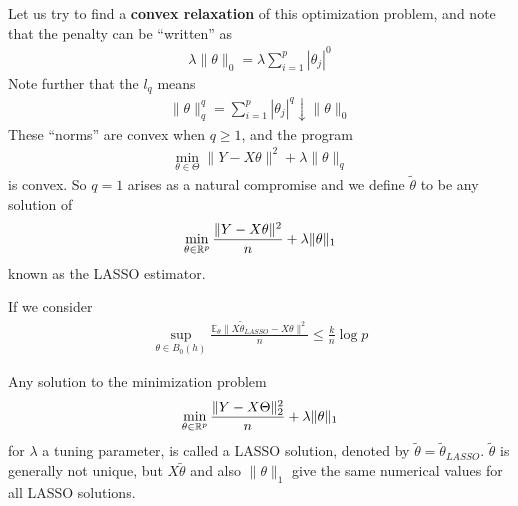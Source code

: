 Let us try to find a \textbf{convex relaxation} of this optimization
problem, and note that the penalty can be ``written'' as
\begin{align}
  \label{eq:113}
  \lambda \| \theta \|_{0} = \lambda \sum_{i=1}^{p} |\theta_{j}|^{0}
\end{align}  Note further that the $l_{q}$ means
\begin{align}
  \label{eq:114}
  \| \theta \|_{q}^{q} = \sum_{i=1}^{p} |\theta_{j}|^{q} \downarrow
  \| \theta \|_{0}
\end{align}  These ``norms'' are convex when $q \geq 1$, and the
program
\begin{align}
  \label{eq:115}
  \min_{\theta \in \Theta} \| Y - X \theta \|^{2} + \lambda \| \theta \|_{q}
\end{align} is convex.  So $q = 1$ arises as a natural compromise and
we define $\tilde \theta$ to be any solution of
\begin{align}
  \label{eq:116}
  \min_{\theta \in \mathbb{R}^{p}} \frac{\| Y - X \theta \|^{2}}{n} + \lambda
  \| \theta \|_{1}
\end{align} known as the LASSO estimator.

If we consider
\begin{align}
  \label{eq:117}
  \sup_{\theta \in B_{0}(h)} \frac{\mathbb{E}_{\theta} \| X \tilde
  \theta_{LASSO} - X \theta \|^{2}}{n} \leq \frac{k}{n} \log p
\end{align} 


Any solution to the minimization problem
\begin{align}
  \label{eq:105}
  \min_{\theta \in \mathbb{R}^{p}} \frac{\| Y - X \Theta \|^{2}_{2}}{n} +
  \lambda \| \theta \|_{1}
\end{align} for $\lambda$ a tuning parameter, is called a LASSO
solution, denoted by $\tilde \theta = \tilde \theta_{LASSO}$.  $\tilde
\theta$ is generally not unique, but $X \tilde \theta$ and also $\|
\theta \|_{1}$ give the same numerical values for all LASSO
solutions.

